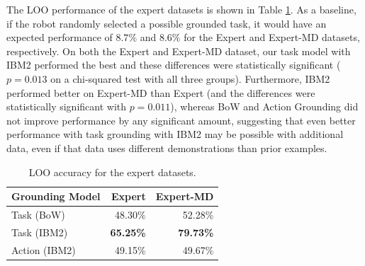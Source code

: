 \documentclass[conference]{IEEEtran}
\begin{document}
The LOO performance of the expert datasets is shown in Table \ref{tab:res_e}. As a baseline, if the robot randomly selected a possible grounded task, it would have an expected performance of $8.7\%$ and $8.6\%$ for the Expert and Expert-MD datasets, respectively. On both the Expert and Expert-MD dataset, our task model with IBM2 performed the best and these differences were statistically significant ($p = 0.013$ on a chi-squared test with all three groups). Furthermore, IBM2 performed better on Expert-MD than Expert (and the differences were statistically significant with $p = 0.011$), whereas BoW and Action Grounding did not improve performance by any significant amount, suggesting that even better performance with task grounding with IBM2 may be possible with additional data, even if that data uses different demonstrations than prior examples. 


\begin{table}[tb]
\begin{center}
\begin{tabular}{@{}lrr@{}} \toprule
Grounding Model & Expert & Expert-MD \\ \midrule
Task (BoW) & 48.30\% & 52.28\% \\ 
Task (IBM2) & {\bf 65.25\%} & {\bf 79.73\%}  \\ 
Action (IBM2) & 49.15\% & 49.67\% \\ \bottomrule
\hline
 \end{tabular} 
 \caption{\small LOO accuracy for the expert datasets.}
 \label{tab:res_e}
\end{center}
\end{table}
\end{document}
